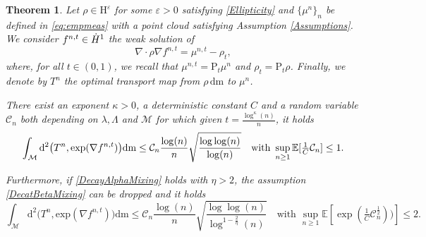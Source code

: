\documentclass[11pt,a4paper,oneside]{amsart}
\numberwithin{equation}{section}
\newtheorem{theorem}{Theorem}[section]
\newcommand{\dd}{\mathrm{d}}
\newcommand{\LL}{\mathrm{L}}
\newcommand{\pp}{\mathrm{P}}
\newcommand{\m}{\mathrm{m}}
\begin{document}
%
%
\begin{theorem}\label{th1}
%
Let $\rho\in \mathrm{H}^{\varepsilon}$ for some $\varepsilon>0$ satisfying \eqref{Ellipticity} and $\{\mu^{n}\}_n$ be defined in \eqref{eq:empmeas} with a point cloud satisfying Assumption \ref{Assumptions}. We consider $f^{n,t}\in {\rm \dot{H}^1}$ the weak solution of
%
\begin{equation}\label{eq:f^ntBis}
\nabla\cdot \rho\nabla f^{n,t} =\mu^{n,t}-\rho_t,
\end{equation}
%
where, for all $t\in (0,1)$, we recall that $\mu^{n,t}=\pp_t\mu^n$ and $\rho_t=\pp_t\rho$. Finally, we denote by $T^n$ the optimal transport map from $\rho\,\dd \m$ to $\mu^n$. 
%
\medskip
%

There exist an exponent $\kappa>0$, a deterministic constant $C$ and a random variable $\mathcal{C}_n$ both depending on $\lambda,\Lambda$ and $\mathcal{M}$ for which given $t=\frac{\log^{\kappa}(n)}{n}$, it holds
%
\begin{equation}\label{ApproximationTransportMap}
\int_\mathcal{M} \mathrm{d}^2\big(T^n,\mathrm{exp}(\nabla f^{n,t})\big)\dd \mathrm{m}\leq \mathcal{C}_n\frac{\log(n)}{n}\sqrt{\frac{\log\log(n)}{\log(n)}}\quad\text{with \,$\sup_{n\geq 1}\mathbb{E}[\tfrac{1}{C}\mathcal{C}_n]\leq 1$.}
\end{equation}
%
%

%
\medskip
%

Furthermore, if \eqref{DecayAlphaMixing} holds with $\eta>2$, the assumption \eqref{DecatBetaMixing} can be dropped and it holds
%
\begin{equation}\label{ApproximationTransportMapBis}
%
\int_\mathcal{M} \mathrm{d}^2\big(T^n,\mathrm{exp}(\nabla f^{n,t})\big)\dd \mathrm{m}\leq \mathcal{C}_n\frac{\log(n)}{n}\sqrt{\frac{\log\log(n)}{\log^{1-\frac{2}{\eta}}(n)}}\quad\text{with }\sup_{n\geq 1}\mathbb{E}[\exp(\tfrac{1}{C}\mathcal{C}_n^\frac12))]\leq 2.
%
\end{equation}
%
%
\end{theorem}
\end{document}
